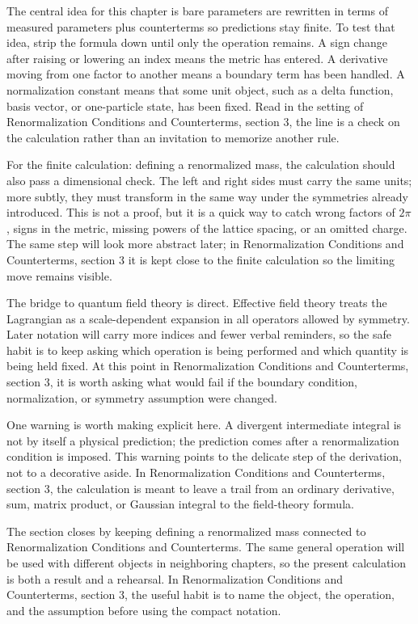 The central idea for this chapter is bare parameters are rewritten in terms of measured parameters plus counterterms so predictions stay finite.  To test that idea, strip the formula down until only the operation remains.  A sign change after raising or lowering an index means the metric has entered.  A derivative moving from one factor to another means a boundary term has been handled.  A normalization constant means that some unit object, such as a delta function, basis vector, or one-particle state, has been fixed.  Read in the setting of Renormalization Conditions and Counterterms, section 3, the line is a check on the calculation rather than an invitation to memorize another rule.

For the finite calculation: defining a renormalized mass, the calculation should also pass a dimensional check.  The left and right sides must carry the same units; more subtly, they must transform in the same way under the symmetries already introduced.  This is not a proof, but it is a quick way to catch wrong factors of \(2\pi\), signs in the metric, missing powers of the lattice spacing, or an omitted charge.  The same step will look more abstract later; in Renormalization Conditions and Counterterms, section 3 it is kept close to the finite calculation so the limiting move remains visible.

The bridge to quantum field theory is direct.  Effective field theory treats the Lagrangian as a scale-dependent expansion in all operators allowed by symmetry.  Later notation will carry more indices and fewer verbal reminders, so the safe habit is to keep asking which operation is being performed and which quantity is being held fixed.  At this point in Renormalization Conditions and Counterterms, section 3, it is worth asking what would fail if the boundary condition, normalization, or symmetry assumption were changed.

One warning is worth making explicit here.  A divergent intermediate integral is not by itself a physical prediction; the prediction comes after a renormalization condition is imposed.  This warning points to the delicate step of the derivation, not to a decorative aside.  In Renormalization Conditions and Counterterms, section 3, the calculation is meant to leave a trail from an ordinary derivative, sum, matrix product, or Gaussian integral to the field-theory formula.

The section closes by keeping defining a renormalized mass connected to Renormalization Conditions and Counterterms.  The same general operation will be used with different objects in neighboring chapters, so the present calculation is both a result and a rehearsal.  In Renormalization Conditions and Counterterms, section 3, the useful habit is to name the object, the operation, and the assumption before using the compact notation.



